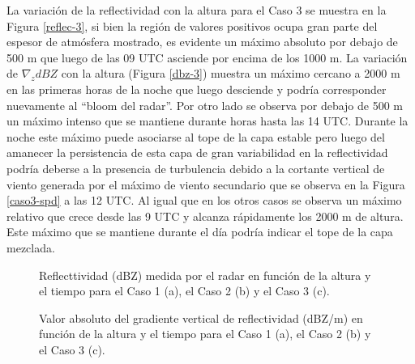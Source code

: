 \documentclass[12pt,spanish,oneside, a4paper]{book}
\begin{document}
La variación de la reflectividad con la altura para el Caso 3 se muestra
en la Figura \ref{reflec-3}, si bien la región de valores positivos
ocupa gran parte del espesor de atmósfera mostrado, es evidente un
máximo absoluto por debajo de 500 m que luego de las 09 UTC asciende por
encima de los 1000 m. La variación de \(\nabla_z dBZ\) con la altura
(Figura \ref{dbz-3}) muestra un máximo cercano a 2000 m en las primeras
horas de la noche que luego desciende y podría corresponder nuevamente
al ``bloom del radar''. Por otro lado se observa por debajo de 500 m un
máximo intenso que se mantiene durante horas hasta las 14 UTC. Durante
la noche este máximo puede asociarse al tope de la capa estable pero
luego del amanecer la persistencia de esta capa de gran variabilidad en
la reflectividad podría deberse a la presencia de turbulencia debido a
la cortante vertical de viento generada por el máximo de viento
secundario que se observa en la Figura \ref{caso3-spd} a las 12 UTC. Al
igual que en los otros casos se observa un máximo relativo que crece
desde las 9 UTC y alcanza rápidamente los 2000 m de altura. Este máximo
que se mantiene durante el día podría indicar el tope de la capa
mezclada.

\begin{figure}

{\centering {}\newline{}\newline{}

}

\caption{Reflecttividad (dBZ) medida por el radar en función de la altura y el tiempo para el Caso 1 (a), el Caso 2 (b) y el Caso 3 (c). \label{dbz}}\label{fig:dbz}
\end{figure}

\begin{figure}

{\centering {}\newline{}\newline{}

}

\caption{Valor absoluto del gradiente vertical de reflectividad (dBZ/m) en función de la altura y el tiempo para el Caso 1 (a), el Caso 2 (b) y el Caso 3 (c). \label{pblh-dbz}}\label{fig:pblh-dbz}
\end{figure}
\end{document}
